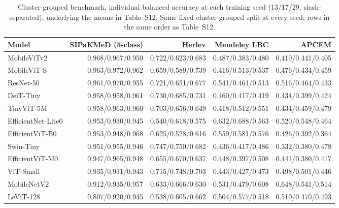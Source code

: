\documentclass[12pt,letterpaper]{article}
\begin{document}
\begin{table}[htbp]
\centering
\caption{Cluster-grouped benchmark, individual balanced accuracy at each training seed (13/17/29, slash-separated), underlying the means in Table~S12. Same fixed cluster-grouped split at every seed; rows in the same order as Table~S12.}
\label{tab:cluster-seeds-raw}
\footnotesize
\begin{tabular}{lrrrr}
\toprule
Model & SIPaKMeD (5-class) & Herlev & Mendeley LBC & APCEM \\
\midrule
MobileViTv2 & 0.968/0.967/0.950 & 0.722/0.623/0.683 & 0.487/0.383/0.480 & 0.410/0.441/0.405 \\
MobileViT-S & 0.963/0.972/0.962 & 0.659/0.589/0.739 & 0.416/0.513/0.537 & 0.476/0.434/0.459 \\
ResNet-50 & 0.961/0.970/0.955 & 0.721/0.651/0.677 & 0.541/0.461/0.513 & 0.516/0.464/0.433 \\
DeiT-Tiny & 0.958/0.958/0.961 & 0.730/0.685/0.731 & 0.460/0.417/0.419 & 0.434/0.399/0.424 \\
TinyViT-5M & 0.958/0.963/0.960 & 0.703/0.656/0.649 & 0.418/0.512/0.551 & 0.434/0.459/0.479 \\
EfficientNet-Lite0 & 0.953/0.930/0.945 & 0.540/0.618/0.575 & 0.632/0.688/0.563 & 0.520/0.548/0.464 \\
EfficientViT-B0 & 0.953/0.948/0.968 & 0.625/0.528/0.616 & 0.559/0.581/0.576 & 0.426/0.392/0.364 \\
Swin-Tiny & 0.951/0.955/0.946 & 0.747/0.750/0.682 & 0.436/0.417/0.486 & 0.332/0.380/0.478 \\
EfficientViT-M0 & 0.947/0.965/0.948 & 0.655/0.670/0.637 & 0.448/0.397/0.508 & 0.441/0.380/0.417 \\
ViT-Small & 0.935/0.931/0.943 & 0.715/0.748/0.703 & 0.443/0.427/0.473 & 0.498/0.501/0.446 \\
MobileNetV2 & 0.912/0.935/0.957 & 0.633/0.666/0.630 & 0.531/0.479/0.608 & 0.648/0.541/0.514 \\
LeViT-128 & 0.807/0.920/0.945 & 0.538/0.605/0.662 & 0.504/0.577/0.518 & 0.510/0.470/0.493 \\
\bottomrule
\end{tabular}
\end{table}
\end{document}
